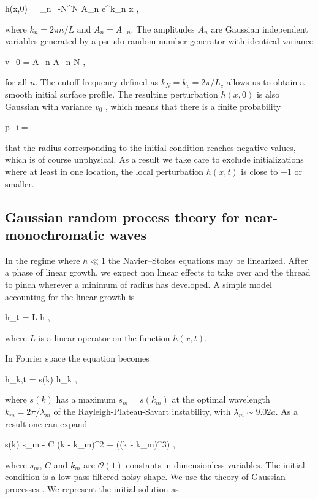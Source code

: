 \be
h(x,0) = \sum_{n=-N}^{N}  A_n e^{\ii k_n x} ,  \label{p1}
\nd

where $k_n=2\pi n / L$ and $A_n = \overline A_{-n}$. 
The amplitudes $A_n$ are Gaussian independent variables
generated by a pseudo random number generator with identical variance

\be
v_0 = \langle A_n \overline A_n \rangle N ,
\nd

for all $n$. The cutoff frequency defined as $k_N=k_c = 2\pi /L_c$ allows us to obtain a smooth
initial surface profile. The resulting perturbation $h(x,0)$ is also Gaussian with variance $v_0$ 
, which means that there is a finite probability

\be
p_i = \exp[{-1/(2 v_0^2)}] \label{p2}
\nd

that the radius corresponding to the initial condition reaches negative values, 
which is of course unphysical. 
As a result we take care to exclude initializations where at least in one location, 
the local perturbation $h(x,t)$ is close to $-1$ or smaller.

\subsection*{Gaussian random process theory for near-monochromatic waves}

In the regime where $h \ll 1$ the Navier--Stokes equations may be linearized.
After a phase of linear growth, we expect non linear effects to take over 
and the thread to pinch wherever a minimum of radius has developed. 
A simple model accounting for the linear growth is  

\be
h_t = L h , 
\nd

where $L$ is a linear operator on the function $h(x,t)$.
%

\newcommand\hhh{\hat h}

In Fourier space the equation becomes

\be
\hhh_{k,t} = s(k) \hhh_k \label{linth} ,
\nd

where $s(k)$ has a maximum $s_m = s(k_m)$ at the optimal wavelength $k_m = 2\pi/\lambda_m$ of
the Rayleigh-Plateau-Savart instability, with $\lambda_m \sim 9.02 a$. 
As a result one can expand

\be
s(k) \simeq s_m -  C (k - k_m)^2 + ((k - k_m)^3) , 
\nd

where $s_m$, $C$ and $k_m$ are $\mathcal{O}(1)$ constants in dimensionless variables.
The initial condition is a low-pass filtered noisy shape. We use the theory of
Gaussian processes .
We represent the initial solution as

